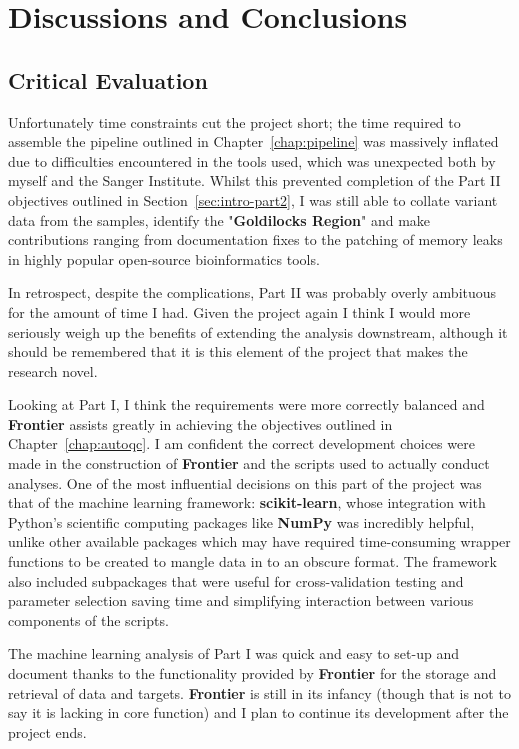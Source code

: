 \part{Discussions and Conclusions}

\chapter{Critical Evaluation}

Unfortunately time constraints cut the project short; the time required to
assemble the pipeline outlined in Chapter~\ref{chap:pipeline}
was massively inflated due to difficulties encountered in the tools used,
which was unexpected both by myself and the Sanger Institute.
Whilst this prevented completion of the Part II objectives outlined in
Section~\ref{sec:intro-part2}, I was still able to collate variant data from the
samples, identify the "\textbf{Goldilocks Region}" and make contributions
ranging from documentation fixes to the patching of memory leaks in
highly popular open-source bioinformatics tools.

In retrospect, despite the complications, Part II was probably overly
ambituous for the amount of time I had. Given the project again I think I would
more seriously weigh up the benefits of extending the analysis downstream,
although it should be remembered that it is this element of the project that
makes the research novel.

Looking at Part I, I think the requirements were more correctly balanced and
\textbf{Frontier} assists greatly in achieving the objectives outlined in
Chapter~\ref{chap:autoqc}. I am confident the correct development choices were
made in the construction of \textbf{Frontier} and the scripts used to actually
conduct analyses. One of the most influential decisions on this part of the
project was that of the machine learning framework: \textbf{scikit-learn}, whose
integration with Python's scientific computing packages like \textbf{NumPy} was
incredibly helpful, unlike other available packages which may have required
time-consuming wrapper functions to be created to mangle data in to an obscure
format. The framework also included subpackages that were useful for
cross-validation testing and parameter selection saving time and simplifying
interaction between various components of the scripts.

The machine learning analysis of Part I was quick and easy to set-up and
document thanks to the functionality provided by \textbf{Frontier} for the
storage and retrieval of data and targets. \textbf{Frontier} is still in its
infancy (though that is not to say it is lacking in core function) and I plan to
continue its development after the project ends.


